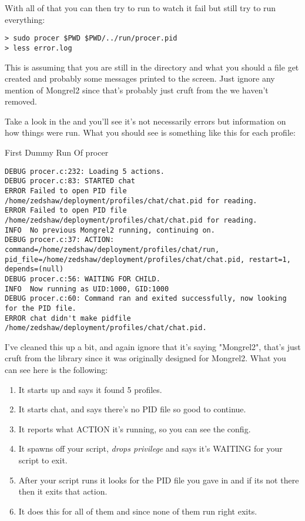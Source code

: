 With all of that you can then try to run  to watch
it fail but still try to run everything:

\begin{Verbatim}
> sudo procer $PWD $PWD/../run/procer.pid
> less error.log
\end{Verbatim}

This is assuming that you are still in the  directory
and what you should a file  get created and 
probably some messages printed to the screen.  Just ignore any
mention of Mongrel2 since that's probably just cruft from the 
we haven't removed.

Take a look in the  and you'll see it's not necessarily
errors but information on how things were run.  What you should
see is something like this for each profile:

\begin{code}{First Dummy Run Of procer}
\begin{Verbatim}
DEBUG procer.c:232: Loading 5 actions.
DEBUG procer.c:83: STARTED chat
ERROR Failed to open PID file /home/zedshaw/deployment/profiles/chat/chat.pid for reading.
ERROR Failed to open PID file /home/zedshaw/deployment/profiles/chat/chat.pid for reading.
INFO  No previous Mongrel2 running, continuing on.
DEBUG procer.c:37: ACTION: command=/home/zedshaw/deployment/profiles/chat/run, pid_file=/home/zedshaw/deployment/profiles/chat/chat.pid, restart=1, depends=(null)
DEBUG procer.c:56: WAITING FOR CHILD.
INFO  Now running as UID:1000, GID:1000
DEBUG procer.c:60: Command ran and exited successfully, now looking for the PID file.
ERROR chat didn't make pidfile /home/zedshaw/deployment/profiles/chat/chat.pid.
\end{Verbatim}
\end{code}

I've cleaned this up a bit, and again ignore that it's saying "Mongrel2", 
that's just cruft from the library since it was originally designed
for Mongrel2.  What you can see here is the following:

\begin{enumerate}
\item It starts up and says it found 5 profiles.
\item It starts chat, and says there's no PID file so good to continue.
\item It reports what ACTION it's running, so you can see the config.
\item It spawns off your  script, \emph{drops privilege}
     and says it's WAITING for your script to exit.
\item After your script runs it looks for the PID file you gave in  and if its not there then it exits that action.
\item It does this for all of them and since none of them run right  exits.
\end{enumerate}

